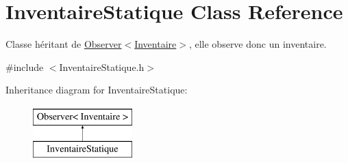 \hypertarget{classInventaireStatique}{\section{Inventaire\-Statique Class Reference}
\label{classInventaireStatique}
}


Classe héritant de \hyperlink{classObserver}{Observer$<$\-Inventaire$>$}, elle observe donc un inventaire.  




{\ttfamily \#include $<$Inventaire\-Statique.\-h$>$}

Inheritance diagram for Inventaire\-Statique\-:\begin{figure}[H]
\begin{center}
\leavevmode
\includegraphics[height=2.000000cm]{classInventaireStatique}
\end{center}
\end{figure}
